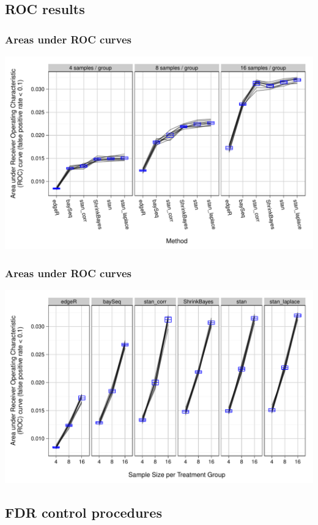 \documentclass[handout]{beamer}
\numberwithin{equation}{section}
\begin{document}
\subsection{ROC results}

\begin{frame}
\frametitle{Areas under ROC curves}
\begin{center}
\includegraphics[scale=0.5]{../fig/auc-facet-TRUE}
\end{center}
\end{frame}

\begin{frame}
\frametitle{Areas under ROC curves}
\begin{center}
\includegraphics[scale=0.5]{../fig/auc-facet-FALSE}
\end{center}
\end{frame}


\subsection{FDR control procedures}
\end{document}
